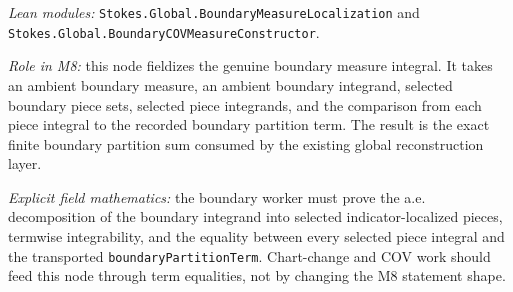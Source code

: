 \begin{theorem}
  \label{anc:m8_boundary_measure_localization}
  \leanok
  \emph{Lean modules:}
  \texttt{Stokes.Global.BoundaryMeasureLocalization} and
  \texttt{Stokes.Global.BoundaryCOVMeasureConstructor}.

  \emph{Role in M8:}
  this node fieldizes the genuine boundary measure integral.  It takes an
  ambient boundary measure, an ambient boundary integrand, selected boundary
  piece sets, selected piece integrands, and the comparison from each piece
  integral to the recorded boundary partition term.  The result is the exact
  finite boundary partition sum consumed by the existing global reconstruction
  layer.

  \emph{Explicit field mathematics:}
  the boundary worker must prove the a.e. decomposition of the boundary
  integrand into selected indicator-localized pieces, termwise integrability,
  and the equality between every selected piece integral and the transported
  \texttt{boundaryPartitionTerm}.  Chart-change and COV work should feed this
  node through term equalities, not by changing the M8 statement shape.
\end{theorem}

